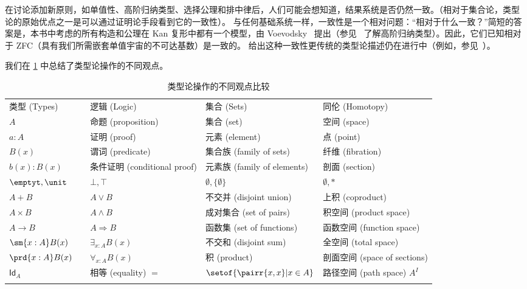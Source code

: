 在讨论添加新原则，如单值性、高阶归纳类型、选择公理和排中律后，人们可能会想知道，结果系统是否仍然一致。（相对于集合论，类型论的原始优点之一是可以通过证明论手段看到它的一致性）。
与任何基础系统一样，一致性是一个相对问题：“相对于什么一致？”简短的答案是，本书中考虑的所有构造和公理在 Kan 复形中都有一个模型，由 Voevodsky~\cite{klv:ssetmodel} 提出（参见~\cite{ls:hits} 了解高阶归纳类型）。因此，它们已知相对于 ZFC（具有我们所需嵌套单值宇宙的不可达基数）是一致的。
给出这种一致性更传统的类型论描述仍在进行中（例如，参见~\cite{lh:canonicity,coquand2012constructive}）。

我们在 \cref{tab:pov} 中总结了类型论操作的不同观点。

\begin{table}[htb]
    \centering
    \OPTsmalltable
    \begin{tabular}{lllll}
        \toprule
        类型 (Types) && 逻辑 (Logic) & 集合 (Sets) & 同伦 (Homotopy)\\ \addlinespace[2pt]
        \midrule
        $A$ && 命题 (proposition) & 集合 (set) & 空间 (space)\\ \addlinespace[2pt]
        $a:A$ && 证明 (proof) & 元素 (element) & 点 (point) \\ \addlinespace[2pt]
        $B(x)$ && 谓词 (predicate) & 集合族 (family of sets) & 纤维 (fibration) \\ \addlinespace[2pt]
        $b(x) : B(x)$ && 条件证明 (conditional proof) & 元素族 (family of elements) & 剖面 (section)\\ \addlinespace[2pt]
        $\emptyt, \unit$ && $\bot, \top$ & $\emptyset, \{ \emptyset \}$ & $\emptyset, *$\\ \addlinespace[2pt]
        $A + B$ && $A\vee B$ & 不交并 (disjoint union) & 上积 (coproduct)\\ \addlinespace[2pt]
        $A\times B$ && $A\wedge B$ & 成对集合 (set of pairs) & 积空间 (product space)\\ \addlinespace[2pt]
        $A\to B$ && $A\Rightarrow B$ & 函数集 (set of functions) & 函数空间 (function space)\\ \addlinespace[2pt]
        $\sm{x:A}B(x)$ &&  $\exists_{x:A}B(x)$ & 不交和 (disjoint sum) & 全空间 (total space)\\ \addlinespace[2pt]
        $\prd{x:A}B(x)$ &&  $\forall_{x:A}B(x)$ & 积 (product) & 剖面空间 (space of sections)\\ \addlinespace[2pt]
        $\mathsf{Id}_{A}$ && 相等 (equality) $=$ & $\setof{\pairr{x,x} | x\in A}$ & 路径空间 (path space) $A^I$ \\ \addlinespace[2pt]
        \bottomrule
    \end{tabular}
    \caption{类型论操作的不同观点比较}\label{tab:pov}
\end{table}

